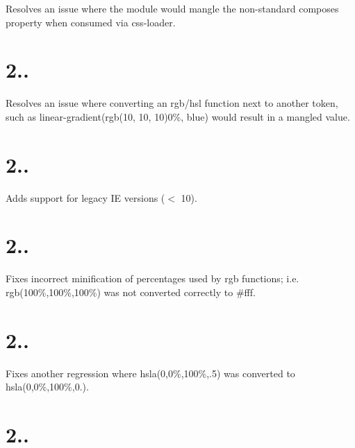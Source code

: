 
\begin{DoxyItemize}
\item Resolves an issue where the module would mangle the non-\/standard {\ttfamily composes} property when consumed via css-\/loader.
\end{DoxyItemize}

\section*{2..}


\begin{DoxyItemize}
\item Resolves an issue where converting an rgb/hsl function next to another token, such as {\ttfamily linear-\/gradient(rgb(10, 10, 10)0\%, blue)} would result in a mangled value.
\end{DoxyItemize}

\section*{2..}


\begin{DoxyItemize}
\item Adds support for legacy IE versions ($<$ 10).
\end{DoxyItemize}

\section*{2..}


\begin{DoxyItemize}
\item Fixes incorrect minification of percentages used by {\ttfamily rgb} functions; i.\+e. {\ttfamily rgb(100\%,100\%,100\%)} was not converted correctly to {\ttfamily \#fff}.
\end{DoxyItemize}

\section*{2..}


\begin{DoxyItemize}
\item Fixes another regression where {\ttfamily hsla(0,0\%,100\%,.5)} was converted to {\ttfamily hsla(0,0\%,100\%,0.)}.
\end{DoxyItemize}

\section*{2..}


